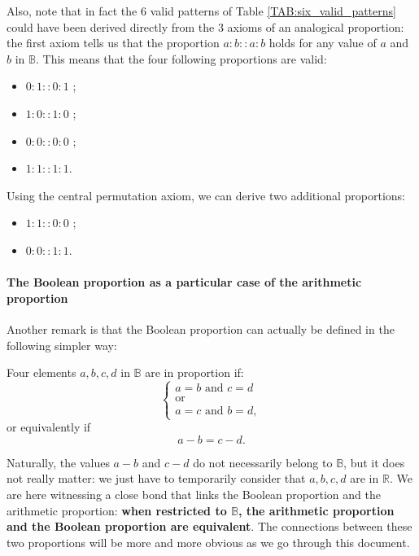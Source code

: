 Also, note that in fact the $6$ valid patterns of Table
\ref{TAB:six_valid_patterns} could have been derived directly from the $3$
axioms of an analogical proportion: the first axiom tells us that the
proportion $a:b::a:b$ holds for any value of $a$ and $b$ in $\mathbb{B}$. This
means that the four following proportions are valid:
\begin{itemize}
  \item $0 : 1 :: 0 :1$ ;
  \item $1 : 0 :: 1 :0$ ;
  \item $0 : 0 :: 0 :0$ ;
  \item $1 : 1 :: 1 :1$.
\end{itemize}
Using the central permutation axiom, we can derive two additional proportions:
\begin{itemize}
  \item $1 : 1 :: 0 : 0$ ;
  \item $0 : 0 :: 1 : 1$.
\end{itemize}

\paragraph{The Boolean proportion as a particular case of the arithmetic
proportion\\}

Another remark is that the Boolean proportion can actually be defined in the
following simpler way:
\begin{definition}
  \label{DEF:boolean_proportion_informal}
  Four elements $a, b, c, d$ in $\mathbb{B}$ are in proportion if:
  $$
  \begin{cases}
    a = b \text{ and } c = d\\
    \text{or}\\
    a = c \text{ and } b = d,
  \end{cases}
  $$
  or equivalently if
  $$a - b = c - d.$$
\end{definition}

Naturally, the values $a - b$ and $c -d$ do not necessarily belong to
$\mathbb{B}$, but it does not really matter: we just have to temporarily
consider that $a, b, c, d$ are in $\mathbb{R}$. We are here witnessing a close
bond that links the Boolean proportion and the arithmetic proportion:
\textbf{when restricted to $\mathbb{B}$, the arithmetic proportion and the
Boolean proportion are equivalent}. The connections between these two
proportions will be more and more obvious as we go through this document.

